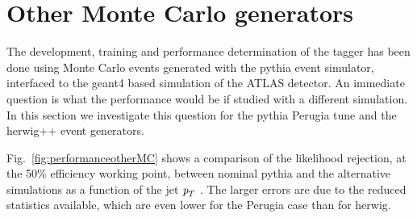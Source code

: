 


\section{Other Monte Carlo generators}\label{sec:otherMC}

The development, training and performance determination of the tagger has been done using Monte Carlo events generated with the {\sc pythia} event simulator, interfaced to the {\sc geant4} based simulation of the ATLAS detector. An immediate question is what the performance would be if studied with a different simulation. In this section we investigate this question for the {\sc pythia} Perugia tune  and the {\sc herwig++} event generators.

Fig.~\ref{fig:performanceotherMC} shows a comparison of the likelihood rejection, at the 50\% efficiency working point,  between nominal {\sc pythia} and the alternative simulations %
as a function of the jet ${\emph{p}_{T}}$ . The larger errors are due to the reduced statistics available, which are even lower for the Perugia case than for {\sc herwig}.



